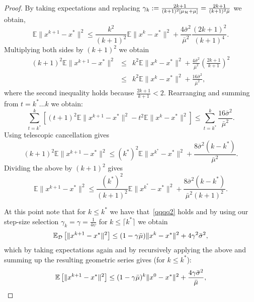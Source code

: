 \documentclass{article}
\begin{document}
\begin{proof}
By taking expectations and replacing  $\gamma_k := \frac{2k+1}{(k+1)^2 [\mu_{{\cal H}}+\mu]}=\frac{2k+1}{(k+1)^2 \bar{\mu}}$ we obtain,
\begin{equation}
\mathbb{E}\| x^{k+1}-x^*\|^2 \leq \frac{k^2}{(k+1)^2}\mathbb{E} \|x^k-x^*\|^2 + \frac{4 \bar{\sigma}^2} {\bar{\mu}^2}\frac{(2k+1)^2}{(k+1)^4 }.
\end{equation}
Multiplying both sides by $(k+1)^2$ we obtain
\begin{eqnarray*}
(k+1)^2 \mathbb{E}\| x^{k+1}-x^*\|^2 &\leq & 
k^2 \mathbb{E} \|x^{k}-x^*\|^2 + \frac{4 \bar{\sigma}^2} {\bar{\mu}^2} \left(\frac{2k+1}{k+1}\right)^2 \\
 &\leq & k^2 \mathbb{E} \|x^{k}-x^*\|^2 + \frac{16 \bar{\sigma}^2} {\bar{\mu}^2},
\end{eqnarray*}
where the second inequality holds because  $\frac{2k+1}{k+1} <2$. Rearranging and summing from $t= k^* \ldots k$ we obtain:
\begin{equation}
\sum_{t=k^*}^{k} \left[ (t+1)^2 \mathbb{E}\| x^{k+1}-x^*\|^2 - t^2 \mathbb{E} \|x^{k}-x^*\|^2 \right] \leq  \sum_{t=k^*}^{k} \frac{16 \bar{\sigma}^2} {\bar{\mu}^2}. 
\end{equation}
Using telescopic cancellation gives
\[
(k+1)^2 \mathbb{E}\| x^{k+1}-x^*\|^2 \leq  (k^*)^2 \mathbb{E} \|x^{k^*}-x^*\|^2 +\frac{8 \bar{\sigma}^2 (k-k^*)}{\bar{\mu}^2}.
\]
Dividing the above by $(k+1)^2$ gives
\begin{equation}
\label{cnaosa2}
 \mathbb{E}\| x^{k+1}-x^*\|^2 \leq  \frac{(k^*)^2}{(k+1)^2 } \mathbb{E} \|x^{k^*}-x^*\|^2 +\frac{8 \bar{\sigma}^2 (k-k^*)}{\bar{\mu}^2(k+1)^2 }. 
\end{equation}

At this point note that for $k \leq k^*$ we have that~\eqref{qqqq2} holds and by using our step-size selection $\gamma_k=\gamma = \frac{1}{4 \psi}$ for $ k \leq \lceil k^* \rceil $ we obtain
\begin{eqnarray}
\label{qqqq3}
\mathbb{E}_{{\cal D}} \left[ \|x^{k+1}-x^*\|^2 \right] \leq (1-\gamma\bar{\mu})\|x^k-x^*\|^2 + 4\gamma^2 \bar{\sigma}^2,
\end{eqnarray}
which by taking expectations again and by recursively applying the above and summing up
the resulting geometric series gives (for $k \leq k^*$):
\begin{eqnarray}
\label{qqqq4}
\mathbb{E} \left[ \|x^{k+1}-x^*\|^2 \right] \leq (1-\gamma\bar{\mu})^k \|x^0-x^*\|^2 + \frac{4\gamma \bar{\sigma}^2}{\bar{\mu}},
\end{eqnarray}


\end{proof}
\end{document}
